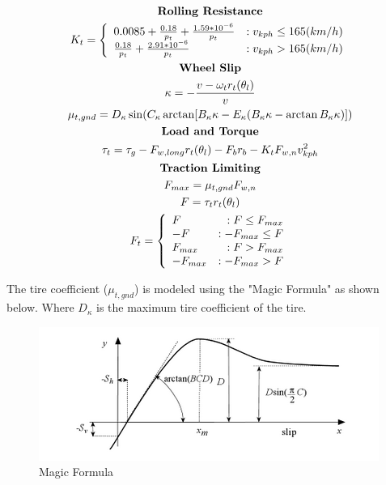 \documentclass[../SimBALink.tex]{subfiles}
\begin{document}
\begin{gather}
\notag \textbf{Rolling Resistance} \\
K_t = 
\left\{
  \begin{array}{lr}
    0.0085 + \frac{0.18}{p_t} + \frac{1.59*10^{-6}}{p_t} & : v_{kph} \le 165 (km/h)\\
    \frac{0.18}{p_t} + \frac{2.91*10^{-6}}{p_t} & : v_{kph} > 165 (km/h)
  \end{array}
\right. \\
\notag \textbf{Wheel Slip} \\
\kappa = -\frac{v - \omega_t r_t(\theta_l)}{v} \\
\mu_{t,gnd} = D_{\kappa}\sin(C_{\kappa} \arctan[B_{\kappa}\kappa - E_{\kappa}(B_{\kappa}\kappa - \arctan B_{\kappa}\kappa)]) \\
\notag \textbf{Load and Torque} \\
\tau_t = \tau_g - F_{w,long}r_t(\theta_l) - F_br_b - K_t F_{w,n} v_{kph}^2 \\
\notag \textbf{Traction Limiting} \\
F_{max} = \mu_{t,gnd} F_{w,n} \\
F = \tau_t r_t(\theta_l) \\
F_t =
\left\{
  \begin{array}{lr}
	F 	& : F \le F_{max} \\
	-F 	& : -F_{max} \le F \\
	F_{max} & : F > F_{max} \\
	-F_{max} & : -F_{max} > F
  \end{array}
\right. 
\end{gather}

The tire coefficient ($\mu_{t,gnd}$) is modeled using the "Magic Formula" as shown below. Where $D_{\kappa}$ is the maximum tire coefficient of the tire. 

 \begin{figure}[h!]
  \centering
  \includegraphics[scale=1]{magic_formula}
  \caption{Magic Formula }
\end{figure}
\end{document}
